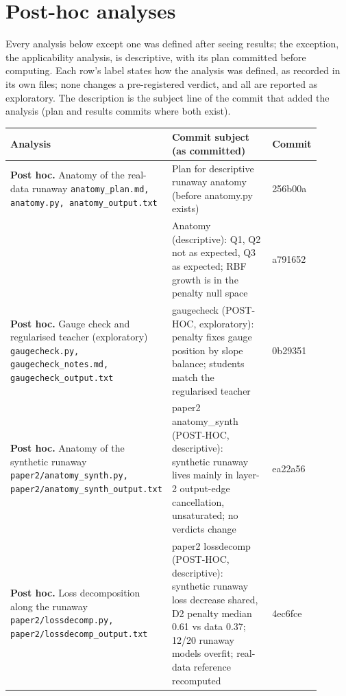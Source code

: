 \section{Post-hoc analyses}\label{app:posthoc}

Every analysis below except one was defined after seeing results; the exception, the applicability analysis, is descriptive, with its plan committed before computing. Each row's label states how the analysis was defined, as recorded in its own files; none changes a pre-registered verdict, and all are reported as exploratory. The description is the subject line of the commit that added the analysis (plan and results commits where both exist).

{\footnotesize\setlength{\tabcolsep}{3pt}\begin{longtable}{R{0.28\linewidth} R{0.52\linewidth} R{0.10\linewidth}}
\toprule
Analysis & Commit subject (as committed) & Commit \\
\midrule
\endhead
\textbf{Post hoc.} Anatomy of the real-data runaway \newline \footnotesize{\texttt{anatomy\_\allowbreak{}plan.md, anatomy.py, anatomy\_\allowbreak{}output.txt}} & Plan for descriptive runaway anatomy (before anatomy.py exists) & 256b00a \\
 & Anatomy (descriptive): Q1, Q2 not as expected, Q3 as expected; RBF growth is in the penalty null space & a791652 \\
\textbf{Post hoc.} Gauge check and regularised teacher (exploratory) \newline \footnotesize{\texttt{gaugecheck.py, gaugecheck\_\allowbreak{}notes.md, gaugecheck\_\allowbreak{}output.txt}} & gaugecheck (POST-HOC, exploratory): penalty fixes gauge position by slope balance; students match the regularised teacher & 0b29351 \\
\textbf{Post hoc.} Anatomy of the synthetic runaway \newline \footnotesize{\texttt{paper2/\allowbreak{}anatomy\_\allowbreak{}synth.py, paper2/\allowbreak{}anatomy\_\allowbreak{}synth\_\allowbreak{}output.txt}} & paper2 anatomy\_synth (POST-HOC, descriptive): synthetic runaway lives mainly in layer-2 output-edge cancellation, unsaturated; no verdicts change & ea22a56 \\
\textbf{Post hoc.} Loss decomposition along the runaway \newline \footnotesize{\texttt{paper2/\allowbreak{}lossdecomp.py, paper2/\allowbreak{}lossdecomp\_\allowbreak{}output.txt}} & paper2 lossdecomp (POST-HOC, descriptive): synthetic runaway loss decrease shared, D2 penalty median 0.61 vs data 0.37; 12/20 runaway models overfit; real-data reference recomputed & 4ec6fce \\

\end{longtable}}
